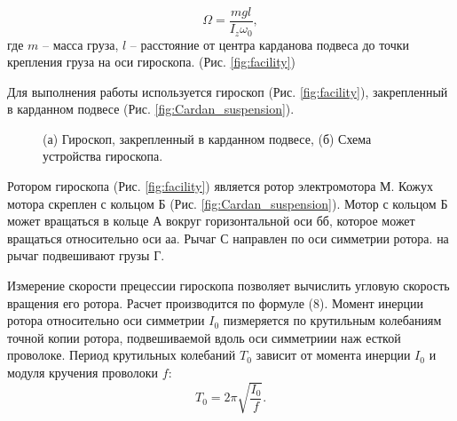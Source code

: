 \documentclass[a4paper,12pt]{article}
\begin{document}
\begin{equation}
	\Omega = \frac{mgl}{I_{z}\omega_{0}},
	\label{eq:teor_equation_omega}
\end{equation}
где $m$ -- масса груза, $l$ -- расстояние от центра карданова подвеса до точки крепления груза на оси гироскопа. (Рис. \ref{fig:facility})

Для выполнения работы используется гироскоп (Рис. \ref{fig:facility}), закрепленный в карданном подвесе (Рис. \ref{fig:Cardan_suspension}).

\begin{figure}[ht!]
	\centering 
	\caption{(а) Гироскоп, закрепленный в карданном подвесе, (б) Схема устройства гироскопа.}
\end{figure}

Ротором гироскопа (Рис. \ref{fig:facility}) является ротор электромотора М. Кожух мотора скреплен с кольцом Б (Рис. \ref{fig:Cardan_suspension}). Мотор с кольцом Б может вращаться в кольце А вокруг горизонтальной оси бб, которое может вращаться относительно оси аа. Рычаг С направлен по оси симметрии ротора. на рычаг подвешивают грузы Г.

Измерение скорости прецессии гироскопа позволяет вычислить угловую скорость вращения его ротора. Расчет производится по формуле (8). Момент инерции ротора относительно оси симметрии $I_0$ пизмеряется по крутильным колебаниям точной копии ротора, подвешиваемой вдоль оси симметриии наж есткой проволоке. Период крутильных колебаний $T_0$ зависит от момента инерции $I_0$ и модуля кручения проволоки $f$:
\[T_0 = 2\pi \sqrt{\frac{I_0}{f}}. \]
\end{document}
